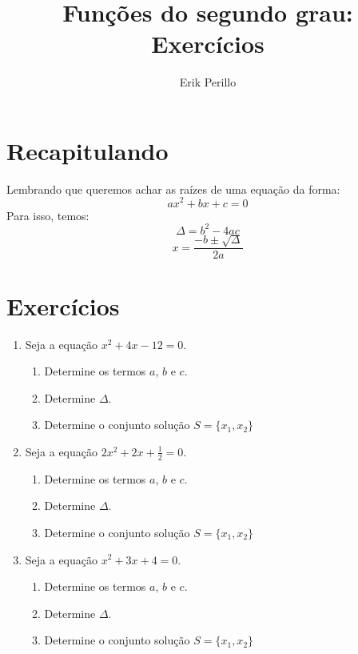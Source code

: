 \documentclass[11pt]{article}
\begin{document}
\title{Funções do segundo grau: Exercícios}
\author{Erik Perillo}
\date{}
\maketitle

\newpage

\section{Recapitulando}
Lembrando que queremos achar as raízes de uma equação da forma:
$$ax^2 + bx + c = 0$$ 
Para isso, temos:
$$\Delta = b^2 - 4ac$$
$$x = \frac{-b \pm \sqrt{\Delta}}{2a}$$

\section{Exercícios}
\begin{enumerate}
	\item Seja a equação $x^2 + 4x - 12 = 0$.
	\begin{enumerate}
		\item Determine os termos $a$, $b$ e $c$.
		\item Determine $\Delta$.
		\item Determine o conjunto solução $S = \{x_1, x_2\}$
	\end{enumerate}

	\item Seja a equação $2x^2 + 2x + \frac{1}{2} = 0$.
	\begin{enumerate}
		\item Determine os termos $a$, $b$ e $c$.
		\item Determine $\Delta$.
		\item Determine o conjunto solução $S = \{x_1, x_2\}$
	\end{enumerate}

	\item Seja a equação $x^2 + 3x + 4 = 0$.
	\begin{enumerate}
		\item Determine os termos $a$, $b$ e $c$.
		\item Determine $\Delta$.
		\item Determine o conjunto solução $S = \{x_1, x_2\}$
	\end{enumerate}
\end{enumerate}

\newpage
\end{document}
